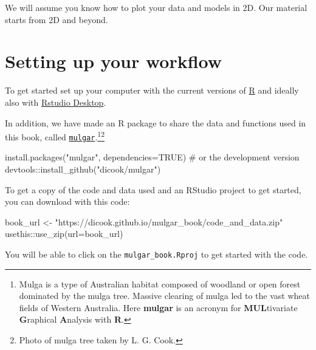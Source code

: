 \documentclass[
  letterpaper,
]{krantz}
\newenvironment{Shaded}{\begin{snugshade}}{\end{snugshade}}
\newcommand{\AttributeTok}[1]{\textcolor[rgb]{0.40,0.45,0.13}{#1}}
\newcommand{\CommentTok}[1]{\textcolor[rgb]{0.37,0.37,0.37}{#1}}
\newcommand{\ConstantTok}[1]{\textcolor[rgb]{0.56,0.35,0.01}{#1}}
\newcommand{\FunctionTok}[1]{\textcolor[rgb]{0.28,0.35,0.67}{#1}}
\newcommand{\NormalTok}[1]{\textcolor[rgb]{0.00,0.23,0.31}{#1}}
\newcommand{\OtherTok}[1]{\textcolor[rgb]{0.00,0.23,0.31}{#1}}
\newcommand{\SpecialCharTok}[1]{\textcolor[rgb]{0.37,0.37,0.37}{#1}}
\newcommand{\StringTok}[1]{\textcolor[rgb]{0.13,0.47,0.30}{#1}}
\begin{document}
We will assume you know how to plot your data and models in 2D. Our
material starts from 2D and beyond.

\section*{Setting up your workflow}\label{setting-up-your-workflow}


To get started set up your computer with the current versions of
\href{https://cran.r-project.org}{R} and ideally also with
\href{https://posit.co/download/rstudio-desktop/}{Rstudio Desktop}.

In addition, we have made an R package to share the data and functions
used in this book, called
\href{http://dicook.github.io/mulgar}{\texttt{mulgar}}.\footnote{Mulga
  is a type of Australian habitat composed of woodland or open forest
  dominated by the mulga tree. Massive clearing of mulga led to the vast
  wheat fields of Western Australia. Here \textbf{mulgar} is an acronym
  for \textbf{MUL}tivariate \textbf{G}raphical \textbf{A}nalysis with
  \textbf{R}.}\footnote{Photo of mulga tree taken by L. G. Cook.}

\begin{Shaded}
\begin{Highlighting}[]
\FunctionTok{install.packages}\NormalTok{(}\StringTok{"mulgar"}\NormalTok{, }\AttributeTok{dependencies=}\ConstantTok{TRUE}\NormalTok{)}
\CommentTok{\# or the development version}
\NormalTok{devtools}\SpecialCharTok{::}\FunctionTok{install\_github}\NormalTok{(}\StringTok{"dicook/mulgar"}\NormalTok{)}
\end{Highlighting}
\end{Shaded}

To get a copy of the code and data used and an RStudio project to get
started, you can download with this code:

\begin{Shaded}
\begin{Highlighting}[]
\NormalTok{book\_url }\OtherTok{\textless{}{-}} \StringTok{"https://dicook.github.io/mulgar\_book/code\_and\_data.zip"}
\NormalTok{usethis}\SpecialCharTok{::}\FunctionTok{use\_zip}\NormalTok{(}\AttributeTok{url=}\NormalTok{book\_url)}
\end{Highlighting}
\end{Shaded}

You will be able to click on the \texttt{mulgar\_book.Rproj} to get
started with the code.
\end{document}
